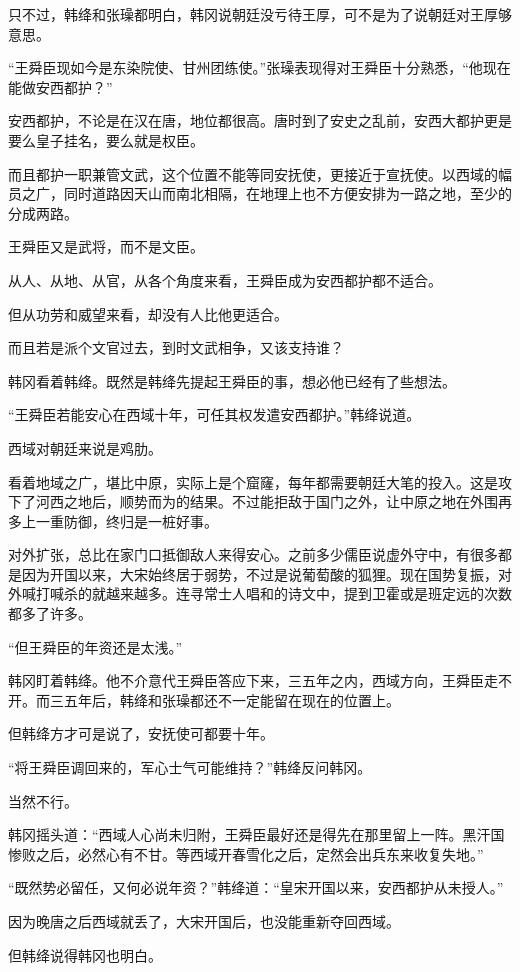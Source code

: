 只不过，韩绛和张璪都明白，韩冈说朝廷没亏待王厚，可不是为了说朝廷对王厚够意思。

“王舜臣现如今是东染院使、甘州团练使。”张璪表现得对王舜臣十分熟悉，“他现在能做安西都护？”

安西都护，不论是在汉在唐，地位都很高。唐时到了安史之乱前，安西大都护更是要么皇子挂名，要么就是权臣。

而且都护一职兼管文武，这个位置不能等同安抚使，更接近于宣抚使。以西域的幅员之广，同时道路因天山而南北相隔，在地理上也不方便安排为一路之地，至少的分成两路。

王舜臣又是武将，而不是文臣。

从人、从地、从官，从各个角度来看，王舜臣成为安西都护都不适合。

但从功劳和威望来看，却没有人比他更适合。

而且若是派个文官过去，到时文武相争，又该支持谁？

韩冈看着韩绛。既然是韩绛先提起王舜臣的事，想必他已经有了些想法。

“王舜臣若能安心在西域十年，可任其权发遣安西都护。”韩绛说道。

西域对朝廷来说是鸡肋。

看着地域之广，堪比中原，实际上是个窟窿，每年都需要朝廷大笔的投入。这是攻下了河西之地后，顺势而为的结果。不过能拒敌于国门之外，让中原之地在外围再多上一重防御，终归是一桩好事。

对外扩张，总比在家门口抵御敌人来得安心。之前多少儒臣说虚外守中，有很多都是因为开国以来，大宋始终居于弱势，不过是说葡萄酸的狐狸。现在国势复振，对外喊打喊杀的就越来越多。连寻常士人唱和的诗文中，提到卫霍或是班定远的次数都多了许多。

“但王舜臣的年资还是太浅。”

韩冈盯着韩绛。他不介意代王舜臣答应下来，三五年之内，西域方向，王舜臣走不开。而三五年后，韩绛和张璪都还不一定能留在现在的位置上。

但韩绛方才可是说了，安抚使可都要十年。

“将王舜臣调回来的，军心士气可能维持？”韩绛反问韩冈。

当然不行。

韩冈摇头道：“西域人心尚未归附，王舜臣最好还是得先在那里留上一阵。黑汗国惨败之后，必然心有不甘。等西域开春雪化之后，定然会出兵东来收复失地。”

“既然势必留任，又何必说年资？”韩绛道：“皇宋开国以来，安西都护从未授人。”

因为晚唐之后西域就丢了，大宋开国后，也没能重新夺回西域。

但韩绛说得韩冈也明白。

